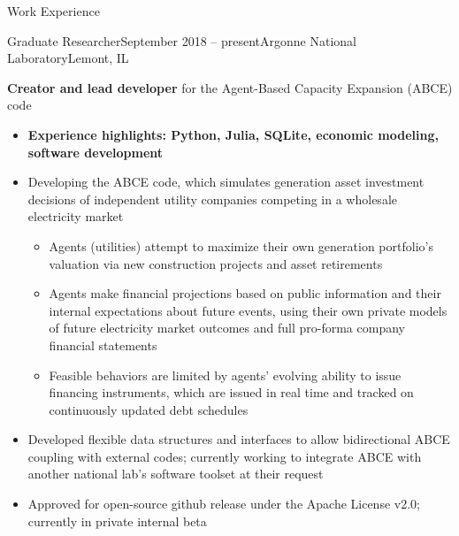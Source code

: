 \documentclass{resume} %
\begin{document}

\begin{rSection}{Work Experience}

\begin{rSubsection}{Graduate Researcher}{September 2018 -- present}{Argonne National Laboratory}{Lemont, IL}
  \item \textbf{Creator and lead developer} for the Agent-Based Capacity Expansion (ABCE) code
    \begin{itemize}
      \setlength{\itemsep}{-3pt}
      \item \textbf{Experience highlights: Python, Julia, SQLite, economic modeling, software development}
      \item Developing the ABCE code, which simulates generation asset investment decisions of independent utility companies competing in a wholesale electricity market
        \begin{itemize}
          \item Agents (utilities) attempt to maximize their own generation portfolio's valuation via new construction projects and asset retirements
          \item Agents make financial projections based on public information and their internal expectations about future events, using their own private models of future electricity market outcomes and full pro-forma company financial statements
          \item Feasible behaviors are limited by agents' evolving ability to issue financing instruments, which are issued in real time and tracked on continuously updated debt schedules
        \end{itemize}
      \item Developed flexible data structures and interfaces to allow bidirectional ABCE coupling with external codes; currently working to integrate ABCE with another national lab's software toolset at their request
      \item Approved for open-source github release under the Apache License v2.0; currently in private internal beta
    \end{itemize}


\end{rSubsection}
\end{rSection}
\end{document}
